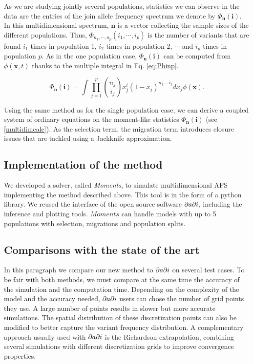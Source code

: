 As we are studying jointly several populations, statistics we can observe in the data are the entries of the join allele frequency spectrum we denote by $\Phi_\textbf{n}(\textbf{i})$. In this multidimensional spectrum, $\textbf{n}$ is a vector collecting the sample sizes of the different populations. Thus, $\Phi_{n_1, \cdots, n_p}(i_1, \cdots, i_p)$ is the number of variants that are found $i_1$ times in population 1, $i_2$ times in population 2, $\cdots$ and $i_p$ times in population $p$. As in the one population case, $\Phi_\textbf{n}(\textbf{i})$ can be computed from $\phi(\textbf{x},t)$ thanks to the multiple integral in Eq. \eqref{eq:Phinp}.

\begin{equation}
\Phi_{\mathbf{n}}(\mathbf{i})= \int \prod_{j=1}^p { n_j \choose i_j} x_j^i (1-x_j)^{n_j-i_j} dx_j \phi(\mathbf{x}).
\label{eq:Phinp}
\end{equation}

Using the same method as for the single population case, we can derive a coupled system of ordinary equations on the moment-like statistics $\Phi_{\mathbf{n}}(\mathbf{i})$ (see \ref{multidimcalc}). As the selection term, the migration term introduces closure issues that are tackled using a Jackknife approximation.

\subsection{Implementation of the method}
We developed a solver, called \textit{Moments}, to simulate multidimensional AFS implementing the method described above. This tool is in the form of a python library. We reused the interface of the open source software $\partial a \partial i$, including the inference and plotting tools. $Moments$ can handle models with up to 5 populations with selection, migrations and population splits.

\subsection{Comparisons with the state of the art}
In this paragraph we compare our new method to $\partial a \partial i$ on several test cases. To be fair with both methods, we must compare at the same time the accuracy of the simulation and the computation time. Depending on the complexity of the model and the accuracy needed, $\partial a \partial i$ users can chose the number of grid points they use. A large number of points results in slower but more accurate simulations. The spatial distribution of these discretization points can also be modified to better capture the variant frequency distribution. A complementary approach usually used with $\partial a \partial i$ is the Richardson extrapolation, combining several simulations with different discretization grids to improve convergence properties.

